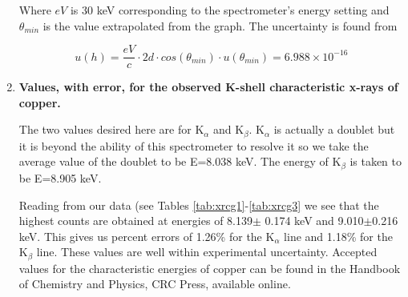 \begin{enumerate}
\noindent Where $eV$ is 30 keV corresponding to the spectrometer's energy setting and $\theta_{min}$ is the value extrapolated from the graph. The uncertainty is found from

\begin{equation}
u(h)=\dfrac{eV}{c}\cdot 2d\cdot cos(\theta_{min})\cdot u(\theta_{min})=6.988\times10^{-16}
\label{equ:twcg4}
\end{equation}

\item {\bf Values, with error, for the observed K-shell characteristic x-rays of copper.}\newline

The two values desired here are for K$_{\alpha}$ and K$_{\beta}$. K$_{\alpha}$ is actually a doublet but it is beyond the ability of this spectrometer to resolve it so we take the average value of the doublet to be E=8.038 keV. The energy of K$_{\beta}$ is taken to be E=8.905 keV. 

Reading from our data (see Tables \ref{tab:xrcg1}-\ref{tab:xrcg3} we see that the highest counts are obtained at energies of 8.139$\pm$ 0.174 keV and 9.010$\pm$0.216 keV. This gives us percent errors of 1.26\% for the K$_{\alpha}$ line and 1.18\% for the K$_{\beta}$ line. These values are well within experimental uncertainty. Accepted values for the characteristic energies of copper can be found in the Handbook of Chemistry and Physics, CRC Press, available online.


\end{enumerate}


